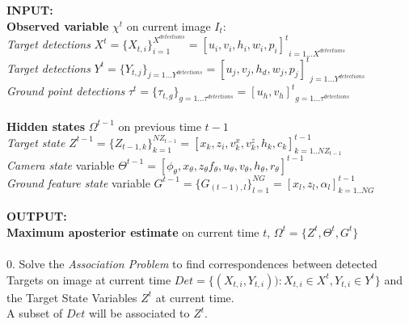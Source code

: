 {\sf
\textbf{INPUT:}\\
[.2cm] \textbf{ Observed variable} $\chi^t$ on current image $I_t$:\\
 \hspace*{0.2cm} \textit{Target detections} $X^t=\{X_{t,i}\}_{i=1}^{X^{detections}}={[u_i,v_i,h_i,w_i,p_i]^t}_{i=1...X^{ detections}}$ \\
 \hspace*{0.2cm} \textit{Target detections} $Y^t =\{Y_{t,j}\}_{j=1...Y^{ detections}}={[u_j,v_j,h_d,w_j,p_j]^t}_{j=1...Y^{detections}}$\\
 \hspace*{0.2cm} \textit{Ground point detections} $\tau^t =\{\tau_{t,g}\}_{g=1...\tau^{ detections}}={[u_h,v_h]^t}_{g=1...\tau^{detections}}$
\\
\\
[.2cm] \textbf{ Hidden states} $\Omega^{t-1}$ on previous time $t-1$\\
 \hspace*{0.2cm} \textit{Target state} $Z^{t-1} = \{Z_{{t-1},k} \}_{k=1}^{NZ_{t-1}}=[ x_k,z_i,v_k^x,v_k^z,h_k,c_k]_{k=1..NZ_{t-1}}^{t-1}$\\
 \hspace*{0.2cm} \textit{Camera state} variable $\Theta^{t-1}=[\phi_{\theta}, x_{\theta}, z_{\theta} f_{\theta}, u_{\theta}, v_{\theta}, h_{\theta},r_{\theta}]^{t-1}$\\
 \hspace*{0.2cm} \textit{Ground feature state} variable $G^{t-1} =\{G_{(t-1),l} \}_{l=1}^{NG}=[x_l,z_l,\alpha_l]_{k=1..NG}^{t-1}$
\\
\\
\textbf{OUTPUT:}\\ 
[.2cm] \textbf{ Maximum aposterior estimate} on current time $t$, $\Omega^{t}=\{Z^{t},\Theta^{t},G^{t}\}$\\
\\
0. Solve the \textit{Association Problem} to find correspondences between detected Targets on image at current time $Det=\{(X_{t,i}, Y_{t,i})):X_{t,i} \in X^t,Y_{t,i} \in Y^t\}$ and the Target State Variables $Z^{t}$ at current time.\\
A subset  of $Det$ will be associated to $Z^t$.\\ 
\\
}
